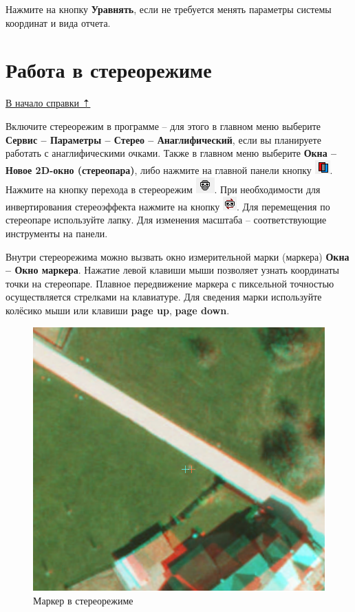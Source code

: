 \documentclass[
  12pt,
]{book}
\begin{document}
Нажмите на кнопку \textbf{Уравнять}, если не требуется менять параметры системы координат и вида отчета.

\hypertarget{photomod-stereo}{%
\section{Работа в стереорежиме}\label{photomod-stereo}}

\protect\hyperlink{photomod}{В начало справки ⇡}

Включите стереорежим в программе -- для этого в главном меню выберите \textbf{Сервис -- Параметры -- Стерео -- Анаглифический}, если вы планируете работать с анаглифическими очками. Также в главном меню выберите \textbf{Окна -- Новое 2D-окно (стереопара)}, либо нажмите на главной панели кнопку \includegraphics{images/Ref15/Stereo2.png}. Нажмите на кнопку перехода в стереорежим \includegraphics{images/Ref15/Stereo.png}. При необходимости для инвертирования стереоэффекта нажмите на кнопку \includegraphics{images/Ref15/Stereo_Invert.png}. Для перемещения по стереопаре используйте лапку. Для изменения масштаба -- соответствующие инструменты на панели.

Внутри стереорежима можно вызвать окно измерительной марки (маркера) \textbf{Окна -- Окно маркера}. Нажатие левой клавиши мыши позволяет узнать координаты точки на стереопаре. Плавное передвижение маркера с пиксельной точностью осуществляется стрелками на клавиатуре. Для сведения марки используйте колёсико мыши или клавиши \textbf{page up}, \textbf{page down}.

\begin{figure}
\centering
\includegraphics{images/Ref15/Anagliph.png}
\caption{Маркер в стереорежиме}
\end{figure}
\end{document}
